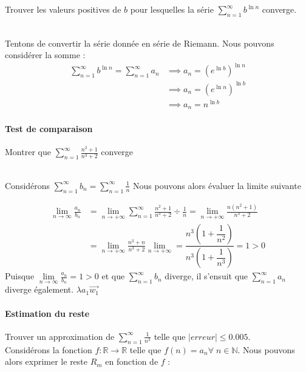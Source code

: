 \documentclass{report}
\begin{document}
\begin{multicols*}{2}
  \paragraph{} 
  \mbox{}\vspace{0.2em} \\
  Trouver les valeurs positives de $b$  pour lesquelles la 
  série $\sum_{n=1}^{\infty }b^{\ln n}$ converge.

  \mbox{} \vspace{0.2em} \\ 
  Tentons de convertir la série donnée en série de 
  Riemann. Nous pouvons considérer la somme :
  \begin{align*}
    \sum_{n=1}^{\infty }b^{\ln n} = 
    \sum_{n=1}^{\infty }  a_n &\implies a_n = (e^{\ln b})^{\ln n} \\             
                  &\implies 
                  a_n = (e^{\ln n})^{\ln b} \\ 
                  &\implies 
                  a_n = n^{\ln b}
  \end{align*}


  \paragraph{Test de comparaison}
  Montrer que $\sum_{n=1}^{\infty }\frac{n^2 + 1}{n^3 +2}$ converge 

  \mbox{} \\
  Considérons $\sum_{n=1}^{\infty }b_n = \sum_{n=1}^{\infty }\frac{1}{n}$
  Nous pouvons alors évaluer la limite suivante


  \begin{align*}
    \lim\limits_{n \to \infty }\frac{a_n}{b_n} 
    &= 
    \lim\limits_{n \to+\infty }\sum_{n=1}^{\infty }\frac{n^2 + 1}{n^3 +2}
    \div \frac{1}{n}  
    = 
    \lim\limits_{n \to+\infty } \frac{n(n^2 + 1)}{n^3 + 2}   \\ 
    &=
    \lim\limits_{n \to+\infty } \frac{n^3 + n}{n^3 + 2}  
    \lim\limits_{n \to+\infty } 
    =
    \dfrac{n^3\left(1 + \dfrac{1}{n^2} \right)}{n^3\left(1 + \dfrac{1}{n^3} \right)}   
    = 1 > 0 
  \end{align*}
  Puisque $\lim\limits_{n \to \infty }\frac{a_n}{b_n} = 1 > 0$ et que 
  $\sum_{n=1}^{\infty }b_n$ diverge, il s'ensuit que $\sum_{n=1}^{\infty }a_n$ 
  diverge également. 
  $\lambda a_1 \vec{w_1}$


  \paragraph{Estimation du reste}
  Trouver un approximation de $\sum_{n=1}^{\infty }\frac{1}{n^3}$ telle que 
  $|erreur| \leq 0.005$. 
  \mbox{}\vspace{1em}\\
  Considérons la fonction $f : \mathbb{R} \rightarrow  \mathbb{R}$  telle que 
  $f(n) = a_n \forall \; n \in \mathbb{N}$. 
  Nous pouvons alors exprimer le reste $R_m$ en fonction de $f$ :


\end{multicols*}
\end{document}
